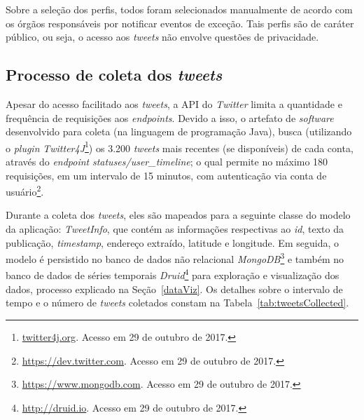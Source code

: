 \documentclass[
	12pt,				%
	oneside,			%
	a4paper,			%
	english,			%
	brazil				%
	]{abntex2ppgsi}
\begin{document}
{{Sobre a seleção dos perfis, todos foram selecionados manualmente de acordo com os órgãos responsáveis por notificar eventos de exceção. Tais perfis são de caráter público, ou seja, o acesso aos \textit{tweets} não envolve questões de privacidade.

\subsection{Processo de coleta dos \textit{tweets}}

Apesar do acesso facilitado aos \textit{tweets}, a API do \textit{Twitter} limita a quantidade e frequência de requisições aos \textit{endpoints}. Devido a isso, o artefato de \textit{software} desenvolvido para coleta (na linguagem de programação Java), busca (utilizando o \textit{plugin} \textit{Twitter4J}\footnote{\url{twitter4j.org}. Acesso em 29 de outubro de 2017.}) os 3.200 \textit{tweets} mais recentes (se disponíveis) de cada conta, através do \textit{endpoint} \textit{statuses/user\_timeline}; o qual permite no máximo 180 requisições, em um intervalo de 15 minutos, com autenticação via conta de usuário\footnote{\url{https://dev.twitter.com}. Acesso em 29 de outubro de 2017.}.

Durante a coleta dos \textit{tweets}, eles são mapeados para a seguinte classe do modelo da aplicação: \textit{TweetInfo}, que contém as informações respectivas ao \textit{id}, texto da publicação, \textit{timestamp}, endereço extraído, latitude e longitude. Em seguida, o modelo é persistido no banco de dados não relacional \textit{MongoDB}\footnote{\url{https://www.mongodb.com}. Acesso em 29 de outubro de 2017.} e também no banco de dados de séries temporais \textit{Druid}\footnote{\url{http://druid.io}. Acesso em 29 de outubro de 2017.} para exploração e visualização dos dados, processo explicado na Seção~\ref{dataViz}. Os detalhes sobre o intervalo de tempo e o número de \textit{tweets} coletados constam na Tabela~\ref{tab:tweetsCollected}.

}}
\end{document}
